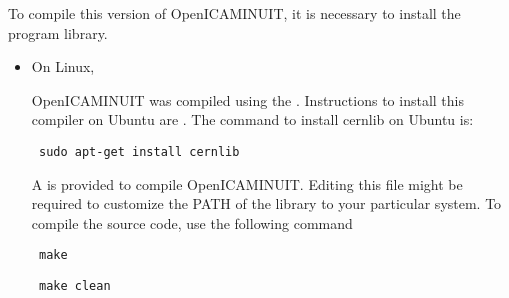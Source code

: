          To compile this version of OpenICAMINUIT, it is necessary to install the  program library.

         \begin{itemize}

           \item On Linux, 

           OpenICAMINUIT was compiled using the . Instructions to install this compiler on Ubuntu are . The command to install cernlib on Ubuntu is: \begin{verbatim} sudo apt-get install cernlib \end{verbatim}

           A  is provided to compile OpenICAMINUIT. Editing this file might be required to customize the PATH of the library to your particular system. 
           To compile the source code, use the following command \begin{verbatim} make \end{verbatim} \begin{verbatim} make clean \end{verbatim}



         \end{itemize}
         
